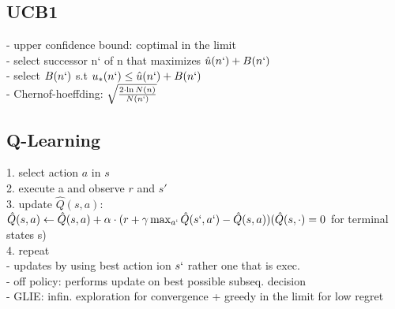 \subsection*{UCB1}
- upper confidence bound: coptimal in the limit \\
- select successor n` of n that maximizes $\hat{u}(n`) + B(n`)$ \\
- select $B(n`)$ s.t $u_*(n`) \leq \hat{u}(n`) + B(n`)$ \\
-  Chernof-hoeffding: $\sqrt{\frac{2 \cdot \ln N(n)}{N(n`)}}$


\subsection*{Q-Learning}
1. select action $a$ in $s$ \\
2. execute a and observe $r$ and $s′$ \\
3. update $\hat{Q}(s,a)$: \\
$\hat{Q}(s, a) \leftarrow \hat{Q}(s, a)+ \alpha \cdot (r + \gamma \max_{a`} \hat{Q}(s`, a`) -  \hat{Q}(s, a))\\ 
( \hat{Q}(s, \cdot) = 0$ for terminal states s) \\ 
4. repeat \\
- updates by using best action ion $s`$ rather one that is exec. \\
- off policy: performs update on best possible subseq. decision \\
- GLIE: infin. exploration for convergence + greedy in the limit for low regret


